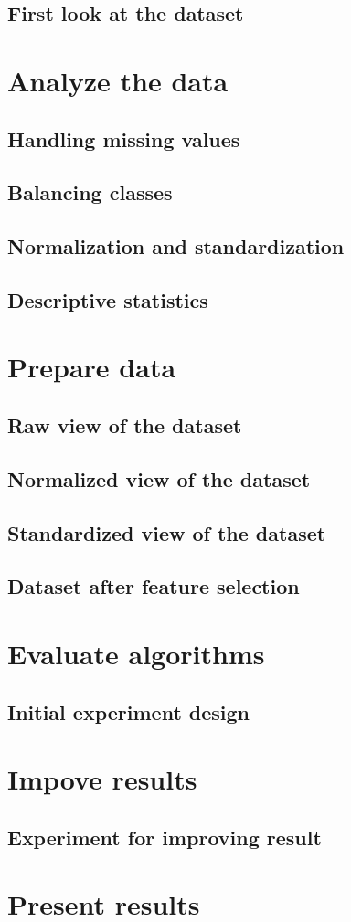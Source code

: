 \section{First look at the dataset}

\chapter{Analyze the data}
\section{Handling missing values}
\section{Balancing classes}
\section{Normalization and standardization}
\section{Descriptive statistics}

\chapter{Prepare data}
\section{Raw view of the dataset}
\section{Normalized view of the dataset}
\section{Standardized view of the dataset}
\section{Dataset after feature selection}

\chapter{Evaluate algorithms}
\section{Initial experiment design}

\chapter{Impove results}
\section{Experiment for improving result}

\chapter{Present results}